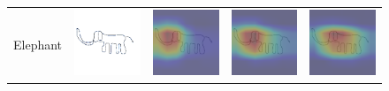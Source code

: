 \begin{figure}[t]
\begin{tabularx}{\textwidth}{lYYYY}
        Elephant & \includegraphics[width=\imagequadsizecams]{Figures/Chapter4/img76.png} &
        \includegraphics[width=\imagequadsizecams]{Figures/Chapter4/elephant1_step_300_cam.png} &
        \includegraphics[width=\imagequadsizecams]{Figures/Chapter4/elephant1_step_2700_cam.png} &
        \includegraphics[width=\imagequadsizecams]{Figures/Chapter4/elephant1_step_4500_cam.png} \\

\end{tabularx}
\end{figure}
